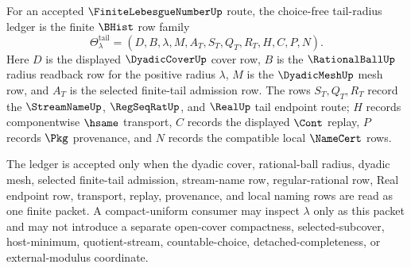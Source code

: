 \begin{definition}
\label{def:finite-lebesgue-number-choice-free-tail-radius-ledger}
For an accepted $\FiniteLebesgueNumberUp$ route, the choice-free tail-radius ledger is the finite $\BHist$ row family
$$
\Theta_{\lambda}^{\mathrm{tail}}=(D,B,\lambda,M,A_T,S_T,Q_T,R_T,H,C,P,N).
$$
Here $D$ is the displayed $\DyadicCoverUp$ cover row, $B$ is the $\RationalBallUp$ radius readback row for the positive radius $\lambda$, $M$ is the $\DyadicMeshUp$ mesh row, and $A_T$ is the selected finite-tail admission row. The rows $S_T,Q_T,R_T$ record the $\StreamNameUp$, $\RegSeqRatUp$, and $\RealUp$ tail endpoint route; $H$ records componentwise $\hsame$ transport, $C$ records the displayed $\Cont$ replay, $P$ records $\Pkg$ provenance, and $N$ records the compatible local $\NameCert$ rows.

The ledger is accepted only when the dyadic cover, rational-ball radius, dyadic mesh, selected finite-tail admission, stream-name row, regular-rational row, Real endpoint row, transport, replay, provenance, and local naming rows are read as one finite packet. A compact-uniform consumer may inspect $\lambda$ only as this packet and may not introduce a separate open-cover compactness, selected-subcover, host-minimum, quotient-stream, countable-choice, detached-completeness, or external-modulus coordinate.
\end{definition}

